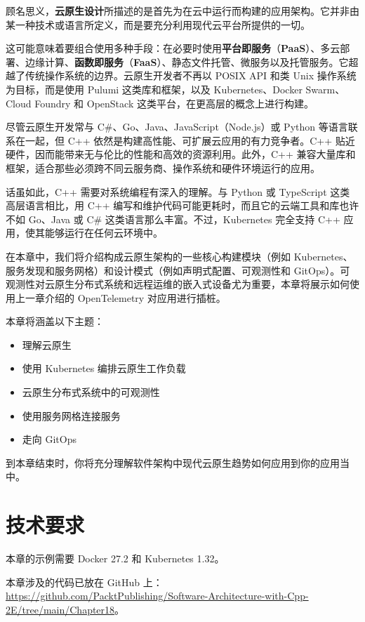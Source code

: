 顾名思义，\textbf{云原生设计}所描述的是首先为在云中运行而构建的应用架构。它并非由某一种技术或语言所定义，而是要充分利用现代云平台所提供的一切。

这可能意味着要组合使用多种手段：在必要时使用\textbf{平台即服务}（\textbf{PaaS}）、多云部署、边缘计算、\textbf{函数即服务}（\textbf{FaaS}）、静态文件托管、微服务以及托管服务。它超越了传统操作系统的边界。云原生开发者不再以 POSIX API 和类 Unix 操作系统为目标，而是使用 Pulumi 这类库和框架，以及 Kubernetes、Docker Swarm、Cloud Foundry 和 OpenStack 这类平台，在更高层的概念上进行构建。

尽管云原生开发常与 C\#、Go、Java、JavaScript（Node.js）或 Python 等语言联系在一起，但 C++ 依然是构建高性能、可扩展云应用的有力竞争者。C++ 贴近硬件，因而能带来无与伦比的性能和高效的资源利用。此外，C++ 兼容大量库和框架，适合那些必须跨不同云服务商、操作系统和硬件环境运行的应用。

话虽如此，C++ 需要对系统编程有深入的理解。与 Python 或 TypeScript 这类高层语言相比，用 C++ 编写和维护代码可能更耗时，而且它的云端工具和库也许不如 Go、Java 或 C\# 这类语言那么丰富。不过，Kubernetes 完全支持 C++ 应用，使其能够运行在任何云环境中。

在本章中，我们将介绍构成云原生架构的一些核心构建模块（例如 Kubernetes、服务发现和服务网格）和设计模式（例如声明式配置、可观测性和 GitOps）。可观测性对云原生分布式系统和远程运维的嵌入式设备尤为重要，本章将展示如何使用上一章介绍的 OpenTelemetry 对应用进行插桩。

本章将涵盖以下主题：

\begin{itemize}
\item 理解云原生
\item 使用 Kubernetes 编排云原生工作负载
\item 云原生分布式系统中的可观测性
\item 使用服务网格连接服务
\item 走向 GitOps
\end{itemize}

到本章结束时，你将充分理解软件架构中现代云原生趋势如何应用到你的应用当中。

\section{技术要求}

本章的示例需要 Docker 27.2 和 Kubernetes 1.32。

本章涉及的代码已放在 GitHub 上：\href{https://github.com/PacktPublishing/Software-Architecture-with-Cpp-2E/tree/main/Chapter18}{https://github.com/PacktPublishing/Software-Architecture-with-Cpp-2E/tree/main/Chapter18}。

